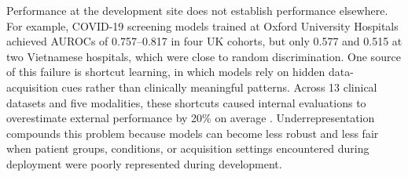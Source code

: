 \documentclass[preprint,5p, 10pt, times]{elsarticle}
\begin{document}
Performance at the development site does not establish performance elsewhere.
For example, COVID-19 screening models trained at Oxford University Hospitals achieved AUROCs of 0.757–0.817 in four UK cohorts, but only 0.577 and 0.515 at two Vietnamese hospitals, which were close to random discrimination\cite{yang2024generalizability}. 
%
One source of this failure is shortcut learning, in which models rely on hidden data-acquisition cues rather than clinically meaningful patterns. 
Across 13 clinical datasets and five modalities, these shortcuts caused internal evaluations to overestimate external performance by 20\% on average \cite{ong2024shortcut}. 
Underrepresentation compounds this problem because models can become less robust and less fair when patient groups, conditions, or acquisition settings encountered during deployment were poorly represented during development\cite{ktena2024generative}. 

\end{document}
